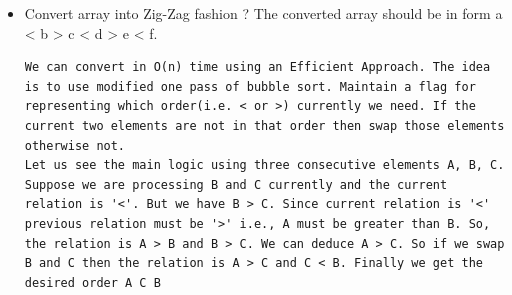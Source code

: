 \documentclass[a4paper,11pt,twoside]{book}
\begin{document}
\begin{itemize}
	\item Convert array into Zig-Zag fashion ? The converted array should be in form a < b > c < d > e < f. 
\begin{lstlisting}[breaklines]
We can convert in O(n) time using an Efficient Approach. The idea is to use modified one pass of bubble sort. Maintain a flag for representing which order(i.e. < or >) currently we need. If the current two elements are not in that order then swap those elements otherwise not.
Let us see the main logic using three consecutive elements A, B, C. Suppose we are processing B and C currently and the current relation is '<'. But we have B > C. Since current relation is '<' previous relation must be '>' i.e., A must be greater than B. So, the relation is A > B and B > C. We can deduce A > C. So if we swap B and C then the relation is A > C and C < B. Finally we get the desired order A C B
\end{lstlisting}

\end{itemize}
\end{document}

